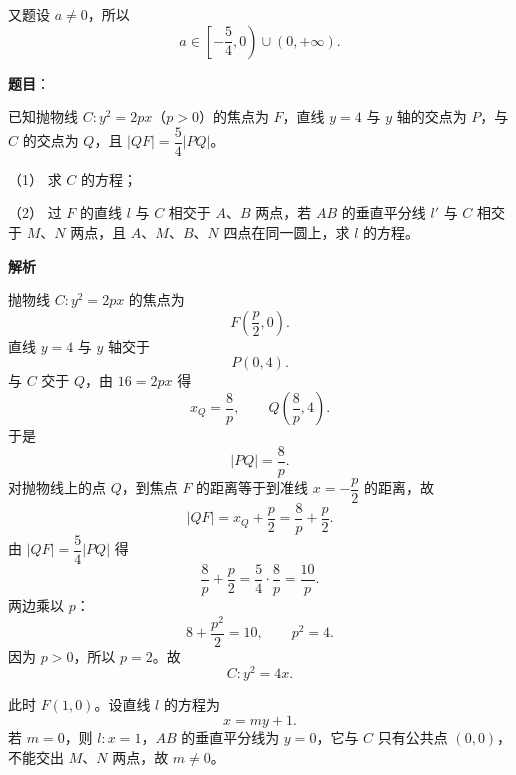 \begin{answer}
又题设 $a\neq0$，所以
\nopagebreak[4]
\[a\in\left[-\frac54,0\right)\cup(0,+\infty).\]


\gkanswer{答案（2）：$a\in\left[-\dfrac54,0\right)\cup(0,+\infty)$。由 $f'(x)\geqslant0$ 在 $(1,2)$ 上恒成立得 $a\geqslant-\dfrac{2x+1}{x^2}$ 对 $x\in(1,2)$ 恒成立，右端最大值为 $-\dfrac54$。}

\end{answer}
\begin{answer}

\textbf{题目}：

已知抛物线 $C:y^2=2px$（$p>0$）的焦点为 $F$，直线 $y=4$ 与 $y$ 轴的交点为 $P$，与 $C$ 的交点为 $Q$，且 $|QF|=\dfrac54|PQ|$。

（1） 求 $C$ 的方程；

（2） 过 $F$ 的直线 $l$ 与 $C$ 相交于 $A$、$B$ 两点，若 $AB$ 的垂直平分线 $l'$ 与 $C$ 相交于 $M$、$N$ 两点，且 $A$、$M$、$B$、$N$ 四点在同一圆上，求 $l$ 的方程。

\textbf{解析}


抛物线 $C:y^2=2px$ 的焦点为
\nopagebreak[4]
\[F\left(\frac p2,0\right).\]
直线 $y=4$ 与 $y$ 轴交于
\nopagebreak[4]
\[P(0,4).\]
与 $C$ 交于 $Q$，由 $16=2px$ 得
\nopagebreak[4]
\[x_Q=\frac8p,\qquad Q\left(\frac8p,4\right).\]
于是
\nopagebreak[4]
\[|PQ|=\frac8p.\]
对抛物线上的点 $Q$，到焦点 $F$ 的距离等于到准线 $x=-\dfrac p2$ 的距离，故
\nopagebreak[4]
\[|QF|=x_Q+\frac p2=\frac8p+\frac p2.\]
由 $|QF|=\dfrac54|PQ|$ 得
\nopagebreak[4]
\[\frac8p+\frac p2=\frac54\cdot\frac8p=\frac{10}{p}.\]
两边乘以 $p$：
\nopagebreak[4]
\[8+\frac{p^2}{2}=10,\qquad p^2=4.\]
因为 $p>0$，所以 $p=2$。故
\nopagebreak[4]
\[C:y^2=4x.\]


此时 $F(1,0)$。设直线 $l$ 的方程为
\nopagebreak[4]
\[x=my+1.\]
若 $m=0$，则 $l:x=1$，$AB$ 的垂直平分线为 $y=0$，它与 $C$ 只有公共点 $(0,0)$，不能交出 $M$、$N$ 两点，故 $m\neq0$。


\end{answer}
